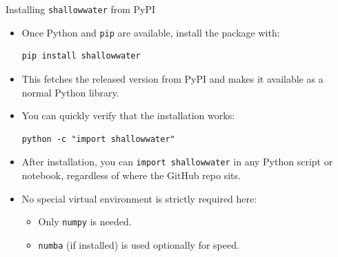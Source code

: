 \documentclass[]{beamer}
\begin{document}
\begin{frame}[fragile,shrink=8]{Installing \texttt{shallowwater} from PyPI}
\begin{itemize}
  \item Once Python and \texttt{pip} are available, install the package with:
\begin{verbatim}
pip install shallowwater
\end{verbatim}

  \item This fetches the released version from PyPI and makes it available as a
        normal Python library.

  \item You can quickly verify that the installation works:
\begin{verbatim}
python -c "import shallowwater"
\end{verbatim}

  \item After installation, you can \texttt{import shallowwater} in any
        Python script or notebook, regardless of where the GitHub repo sits.

  \item No special virtual environment is strictly required here:
    \begin{itemize}
      \item Only \texttt{numpy} is needed.
      \item \texttt{numba} (if installed) is used optionally for speed.
    \end{itemize}
\end{itemize}
\end{frame}
\end{document}
